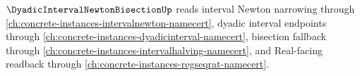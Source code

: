 $\DyadicIntervalNewtonBisectionUp$ reads interval Newton narrowing through \autoref{ch:concrete-instances-intervalnewton-namecert}, dyadic interval endpoints through \autoref{ch:concrete-instances-dyadicinterval-namecert}, bisection fallback through \autoref{ch:concrete-instances-intervalhalving-namecert}, and Real-facing readback through \autoref{ch:concrete-instances-regseqrat-namecert}.


